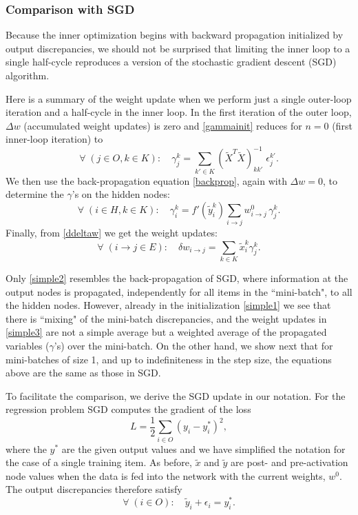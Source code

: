 \documentclass[12pt]{article}
\begin{document}
\subsubsection*{Comparison with SGD}

Because the inner optimization begins with backward propagation initialized by output discrepancies, we should not be surprised that limiting the inner loop to a single half-cycle reproduces a version of the stochastic gradient descent (SGD) algorithm. 

Here is a summary of the weight update when we perform just a single outer-loop iteration and a half-cycle in the inner loop. In the first iteration of the outer loop, $\Delta w$ (accumulated weight updates) is zero and \eqref{gammainit} reduces for $n=0$ (first inner-loop iteration) to
\begin{equation}\label{simple1}
\forall\; (j\in O, k\in K):\quad \gamma^k_j=\sum_{k'\in K}(\widetilde{X}^T \widetilde{X})^{-1}_{k k'}\;\epsilon^{k'}_j.
\end{equation}
We then use the back-propagation equation \eqref{backprop}, again with $\Delta w=0$, to determine the $\gamma$'s on the hidden nodes:
\begin{equation}\label{simple2}
\forall\; (i\in H, k\in K):\quad \gamma^k_i=f'(\tilde{y}^k_i)\sum_{i\to j}w^0_{i\to j}\,\gamma^k_j.
\end{equation}
Finally, from \eqref{ddeltaw} we get the weight updates:
\begin{equation}\label{simple3}
\forall\; (i\to j\in E):\quad \delta w_{i\to j}=\sum_{k\in K}\tilde{x}^k_i\gamma^k_j.
\end{equation}

Only \eqref{simple2} resembles the back-propagation of SGD, where information at the output nodes is propagated, independently for all items in the ``mini-batch", to all the hidden nodes. However, already in the initialization \eqref{simple1} we see that there is ``mixing" of the mini-batch discrepancies, and the weight updates in \eqref{simple3} are not a simple average but a weighted average of the propagated variables ($\gamma$'s) over the mini-batch. On the other hand, we show next that for mini-batches of size 1, and up to indefiniteness in the step size, the equations above are the same as those in SGD. 

To facilitate the comparison, we derive the SGD update in our notation.
For the regression problem SGD computes the gradient of the loss
\begin{equation}
L=\frac{1}{2}\sum_{i\in O}(y_i-y^*_i)^2,
\end{equation}
where the $y^*$ are the given output values and we have simplified the notation for the case of a single training item. As before, $\tilde{x}$ and $\tilde{y}$ are post- and pre-activation node values when the data is fed into the network with the current weights, $w^0$. The output discrepancies therefore satisfy
\begin{equation}
\forall\; (i\in O):\quad \tilde{y}_i+\epsilon_i=y^*_i.
\end{equation}
\end{document}
